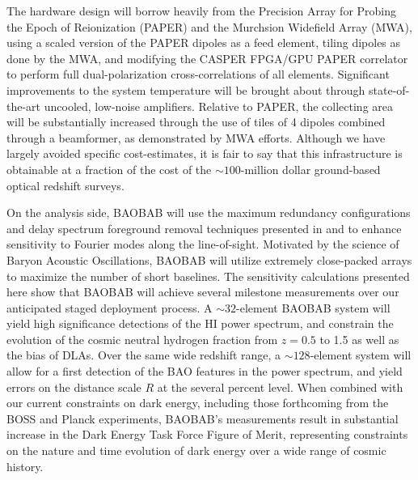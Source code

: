 \documentclass[10pt,iop]{emulateapj}
\begin{document}
The hardware design will borrow heavily from the Precision Array for Probing the Epoch
of Reionization (PAPER) and the Murchsion Widefield Array (MWA), 
using a scaled version of the PAPER dipoles as a feed element, tiling dipoles as done by the MWA,
and modifying the CASPER FPGA/GPU PAPER correlator to perform full
dual-polarization cross-correlations of all elements.  Significant improvements to the
system temperature will be brought about through state-of-the-art uncooled, 
low-noise amplifiers.  Relative to PAPER, the collecting area will be substantially
increased through the use of tiles of 4 dipoles combined through a beamformer, as demonstrated
by MWA efforts.  Although we have largely avoided specific cost-estimates, it is fair to say that
this infrastructure is obtainable at a fraction of the cost of the $\sim100$-million dollar 
ground-based optical redshift surveys.

On the analysis side, BAOBAB will use the maximum redundancy
configurations and delay spectrum foreground removal techniques presented in 
\citet{parsons_et_al_2012a} and \citet{parsons_et_al_2012b} to enhance sensitivity to
Fourier modes along the line-of-sight.  Motivated by the science of Baryon Acoustic Oscillations,
BAOBAB will utilize extremely close-packed arrays to maximize the number of short baselines.
The sensitivity calculations presented here
show that BAOBAB will achieve several milestone measurements over our anticipated staged deployment
process.  A $\sim32$-element BAOBAB system will yield high significance detections of the HI power
spectrum, and constrain the evolution of the cosmic neutral hydrogen fraction from $z = 0.5$ to
1.5 as well as the bias of DLAs.  Over the same wide redshift range, a $\sim128$-element system will allow for a first detection of the BAO features in the
power spectrum, and yield errors on the distance scale $R$ at the several percent level.  When combined
with our current constraints on dark energy, including those forthcoming from the BOSS and Planck 
experiments,
BAOBAB's measurements result in substantial increase in the Dark Energy Task Force Figure of Merit,
representing constraints on the nature and time evolution of dark energy over a wide range of cosmic history.
\end{document}
